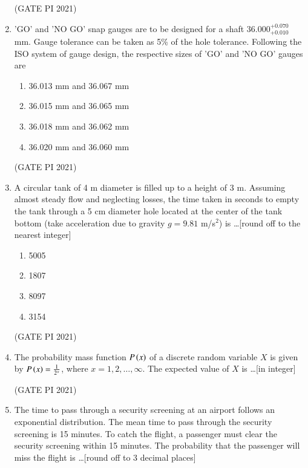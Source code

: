 \documentclass[journal,12pt,onecolumn]{IEEEtran}
\theoremstyle{remark}
\begin{document}
\begin{enumerate}
\hfill (GATE PI 2021)

\item
'GO' and 'NO GO' snap gauges are to be designed for a shaft 36.000$^{+0.070}_{+0.010}$ mm. Gauge tolerance can be taken as 5\% of the hole tolerance. Following the ISO system of gauge design, the respective sizes of 'GO' and 'NO GO' gauges are

\begin{multicols}{2}
\begin{enumerate}
\item 36.013 mm and 36.067 mm
\item 36.015 mm and 36.065 mm
\item 36.018 mm and 36.062 mm
\item 36.020 mm and 36.060 mm
\end{enumerate}
\end{multicols}

\hfill (GATE PI 2021)

\item
A circular tank of 4 m diameter is filled up to a height of 3 m. Assuming almost steady flow and neglecting losses, the time taken in seconds to empty the tank through a 5 cm diameter hole located at the center of the tank bottom (take acceleration due to gravity $g = 9.81$ m/s$^2$) is \dots [round off to the nearest integer]

\begin{multicols}{4}
\begin{enumerate}
\item 5005
\item 1807
\item 8097
\item 3154
\end{enumerate}
\end{multicols}

\hfill (GATE PI 2021)

\item
The probability mass function $P\left(x\right)$ of a discrete random variable $X$ is given by $P\left(x\right) = \frac{1}{2^x}$, where $x = 1, 2, \dots, \infty$. The expected value of $X$ is \dots [in integer]

\hfill (GATE PI 2021)

\item
The time to pass through a security screening at an airport follows an exponential distribution. The mean time to pass through the security screening is 15 minutes. To catch the flight, a passenger must clear the security screening within 15 minutes. The probability that the passenger will miss the flight is \dots [round off to 3 decimal places]


\end{enumerate}
\end{document}
